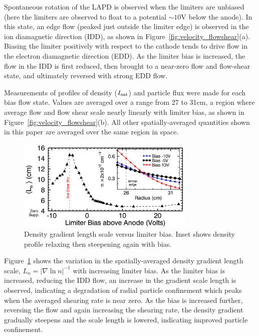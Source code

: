 \documentclass[aps,prl,amsmath,amssymb,preprint,superscriptaddress]{revtex4}
\begin{document}
Spontaneous rotation of the LAPD is observed when the limiters are
unbiased (here the limiters are observed to float to a
potential $\sim 10$V below the anode).  In this state, an edge flow
(peaked just outside the limiter edge) is
observed in the ion diamagnetic direction (IDD), as shown in
Figure~\ref{fig:velocity_flowshear}(a).  Biasing the limiter positively
with respect to the cathode tends to drive flow in the electron
diamagnetic direction (EDD).  As the limiter bias is increased, the
flow in the IDD is first reduced, then brought to a near-zero flow
and flow-shear state, and ultimately reversed with strong EDD flow.

Measurements of profiles of density ($I_{\rm sat}$) and particle flux
were made for each bias flow state. Values are averaged over a range
from 27 to 31cm, a region where average flow and flow shear scale
nearly linearly with limiter bias, as shown in
Figure~\ref{fig:velocity_flowshear}(b).  All other spatially-averaged
quantities shown in this paper are averaged over the same region in space.

\begin{figure}[!htbp]
\centerline{
\includegraphics[width=8.5cm]{densgrad.pdf}}
\caption{\label{fig:densgrad} Density gradient length scale versus limiter bias. Inset shows density profile relaxing then steepening again with bias.}
\end{figure}

Figure~\ref{fig:densgrad} shows the variation in the spatially-averaged density gradient length scale, $L_{n} = \lvert \nabla \ln n \rvert ^{-1}$ with
increasing limiter bias.  As the limiter bias is increased, reducing
the IDD flow, an increase in the gradient scale length is observed,
indicating a degradation of radial particle confinement which peaks
when the averaged shearing rate is near zero. As the bias is
increased further, reversing the flow and again increasing the
shearing rate, the density gradient gradually steepens and the
scale length is lowered, indicating improved particle confinement.  
\end{document}
